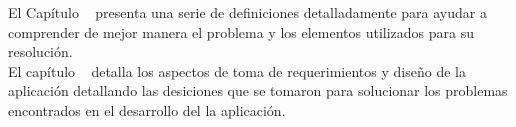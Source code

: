 El Capítulo ~ presenta una serie de definiciones detalladamente para ayudar a comprender de mejor manera el problema y los elementos utilizados para su resolución.\\

El capítulo ~ detalla los aspectos de toma de requerimientos y diseño de la aplicación detallando las desiciones que se tomaron para solucionar los problemas encontrados en el desarrollo del la aplicación.\\